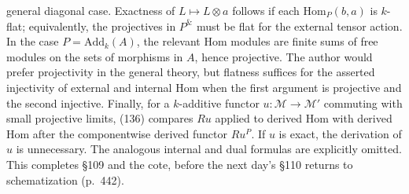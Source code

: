 general diagonal case. Exactness of $L\mapsto L\otimes a$ follows if each $\mathrm{Hom}_P(b,a)$ is $k$-flat; equivalently, the projectives in $P^{\&}$ must be flat for the external tensor action. In the case $P=\mathrm{Add}_k(A)$, the relevant Hom modules are finite sums of free modules on the sets of morphisms in $A$, hence projective. The author would prefer projectivity in the general theory, but flatness suffices for the asserted injectivity of external and internal Hom when the first argument is projective and the second injective. Finally, for a $k$-additive functor $u:\mathcal M\to\mathcal M'$ commuting with small projective limits, (136) compares $Ru$ applied to derived Hom with derived Hom after the componentwise derived functor $Ru^P$. If $u$ is exact, the derivation of $u$ is unnecessary. The analogous internal and dual formulas are explicitly omitted. This completes \S109 and the cote, before the next day's \S110 returns to schematization (p.\ 442).
